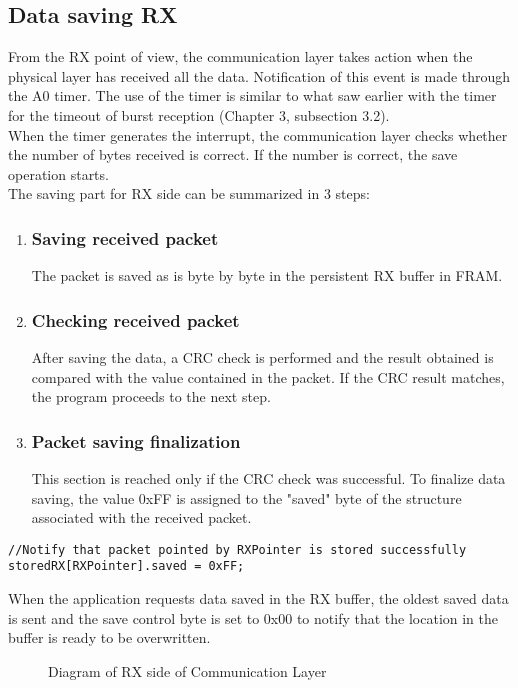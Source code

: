 \subsection{Data saving RX}
From the RX point of view, the communication layer takes action when the physical layer has received all the data. Notification of this event is made through the A0 timer. The use of the timer is similar to what saw earlier with the timer for the timeout of burst reception (Chapter 3, subsection 3.2). \\
When the timer generates the interrupt, the communication layer checks whether the number of bytes received is correct. If the number is correct, the save operation starts.\\
The saving part for RX side can be summarized in 3 steps:
\begin{enumerate}
  \item \subsubsection{Saving received packet}
  The packet is saved as is byte by byte in the persistent RX buffer in FRAM.
  \item \subsubsection{Checking received packet}
  After saving the data, a CRC check is performed and the result obtained is compared with the value contained in the packet. If the CRC result matches, the program proceeds to the next step.
  \item \subsubsection{Packet saving finalization}
  This section is reached only if the CRC check was successful. To finalize data saving, the value 0xFF is assigned to the "saved" byte of the structure associated with the received packet.
\end{enumerate}

\begin{lstlisting}
//Notify that packet pointed by RXPointer is stored successfully
storedRX[RXPointer].saved = 0xFF;
\end{lstlisting}
When the application requests data saved in the RX buffer, the oldest saved data is sent and the save control byte is set to 0x00 to notify that the location in the buffer is ready to be overwritten.
  \begin{figure}[H]
    \centerline{}
    \caption{\footnotesize \centering Diagram of RX side of Communication Layer}
    \label{fig:CommunicationLayerRX}
  \end{figure}

  
\newpage




